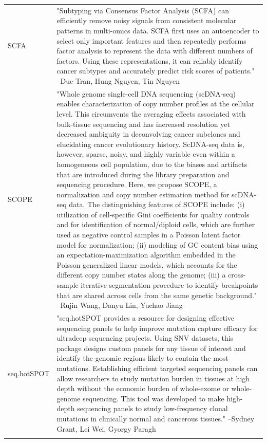 \documentclass[]{article}
\begin{document}
\begin{longtable}[t]{l>{\raggedright\arraybackslash}p{25em}}
SCFA & "Subtyping via Consensus Factor Analysis (SCFA) can
efficiently remove noisy signals from consistent molecular
patterns in multi-omics data. SCFA first uses an autoencoder to
select only important features and then repeatedly performs
factor analysis to represent the data with different numbers of
factors. Using these representations, it can reliably identify
cancer subtypes and accurately predict risk scores of patients." --Duc Tran, Hung Nguyen, Tin Nguyen\\
SCOPE & "Whole genome single-cell DNA sequencing (scDNA-seq)
enables characterization of copy number profiles at the
cellular level. This circumvents the averaging effects
associated with bulk-tissue sequencing and has increased
resolution yet decreased ambiguity in deconvolving cancer
subclones and elucidating cancer evolutionary history.
ScDNA-seq data is, however, sparse, noisy, and highly variable
even within a homogeneous cell population, due to the biases
and artifacts that are introduced during the library
preparation and sequencing procedure. Here, we propose SCOPE, a
normalization and copy number estimation method for scDNA-seq
data. The distinguishing features of SCOPE include: (i)
utilization of cell-specific Gini coefficients for quality
controls and for identification of normal/diploid cells, which
are further used as negative control samples in a Poisson
latent factor model for normalization; (ii) modeling of GC
content bias using an expectation-maximization algorithm
embedded in the Poisson generalized linear models, which
accounts for the different copy number states along the genome;
(iii) a cross-sample iterative segmentation procedure to
identify breakpoints that are shared across cells from the same
genetic background." --Rujin Wang, Danyu Lin, Yuchao Jiang\\
seq.hotSPOT & "seq.hotSPOT provides a resource for designing effective
sequencing panels to help improve mutation capture efficacy for
ultradeep sequencing projects. Using SNV datasets, this package
designs custom panels for any tissue of interest and identify
the genomic regions likely to contain the most mutations.
Establishing efficient targeted sequencing panels can allow
researchers to study mutation burden in tissues at high depth
without the economic burden of whole-exome or whole-genome
sequencing. This tool was developed to make high-depth
sequencing panels to study low-frequency clonal mutations in
clinically normal and cancerous tissues." --Sydney Grant, Lei Wei, Gyorgy Paragh\\
\addlinespace

\end{longtable}
\end{document}
